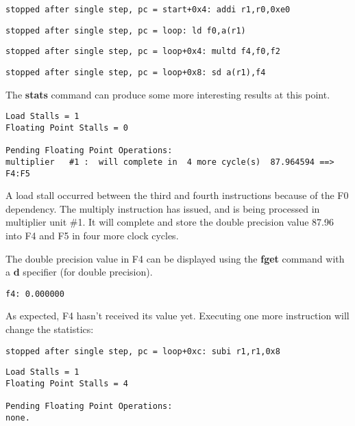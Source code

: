 \begin{verbatim}
stopped after single step, pc = start+0x4: addi r1,r0,0xe0
\end{verbatim}

\begin{verbatim}
stopped after single step, pc = loop: ld f0,a(r1)
\end{verbatim}

\begin{verbatim}
stopped after single step, pc = loop+0x4: multd f4,f0,f2
\end{verbatim}

\begin{verbatim}
stopped after single step, pc = loop+0x8: sd a(r1),f4
\end{verbatim}

The {\bf stats} command can produce some more interesting results 
at this point.\\

\begin{verbatim}
Load Stalls = 1
Floating Point Stalls = 0

Pending Floating Point Operations:
multiplier   #1 :  will complete in  4 more cycle(s)  87.964594 ==> F4:F5
\end{verbatim}

A load stall occurred between the third and fourth instructions because of the
F0 dependency.  The multiply instruction has issued, and is being
processed in multiplier unit \#1.  It will complete and store the
double precision value 87.96 into F4 and F5 in four more clock cycles.

The double precision value in F4 can be displayed using the {\bf fget}
command with a {\bf d} specifier (for double precision). \\

\begin{verbatim}
f4:	0.000000
\end{verbatim}

As expected, F4 hasn't received its value yet.  Executing one more instruction
will change the statistics: \\

\begin{verbatim}
stopped after single step, pc = loop+0xc: subi r1,r1,0x8
\end{verbatim}

\begin{verbatim}
Load Stalls = 1
Floating Point Stalls = 4

Pending Floating Point Operations:
none.
\end{verbatim}

